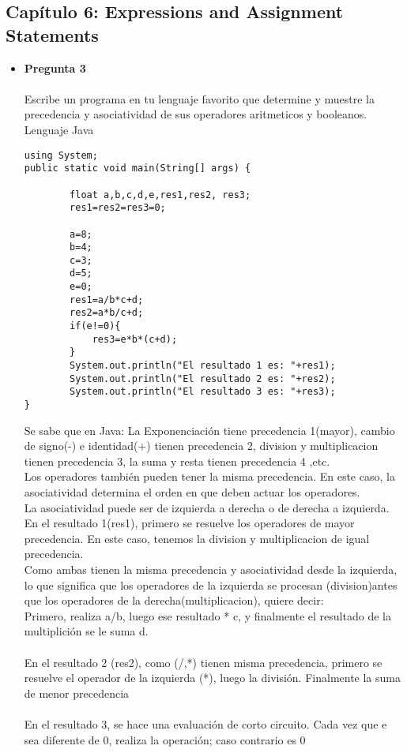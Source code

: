 \documentclass[12pt,oneside]{article}
\begin{document}
\begin{itemize}
\end{itemize}
\subsection{Capítulo 6: Expressions and Assignment Statements}
\begin{itemize}
\item {\bf Pregunta 3} \\\\
Escribe un programa en tu lenguaje favorito que determine y muestre la precedencia y asociatividad de sus operadores aritmeticos y booleanos.\\
Lenguaje Java\\
\begin{lstlisting}[frame=single]  % Start your code-block
using System;
public static void main(String[] args) {
        
        float a,b,c,d,e,res1,res2, res3;
        res1=res2=res3=0;
        
        a=8;
        b=4;
        c=3;
        d=5;
        e=0;
        res1=a/b*c+d;
        res2=a*b/c+d;
        if(e!=0){
            res3=e*b*(c+d);
        }
        System.out.println("El resultado 1 es: "+res1);
        System.out.println("El resultado 2 es: "+res2);
        System.out.println("El resultado 3 es: "+res3);
}

\end{lstlisting}

Se sabe que en Java: La Exponenciación tiene precedencia 1(mayor), cambio de signo(-) e identidad(+) tienen precedencia 2, division y multiplicacion tienen precedencia 3, la suma y resta tienen precedencia 4 ,etc.\\
Los operadores también pueden tener la misma precedencia. En este caso, la asociatividad determina el orden en que deben actuar los operadores. \\
La asociatividad puede ser de izquierda a derecha o de derecha a izquierda.\\
En el resultado 1(res1), primero se resuelve los operadores de mayor precedencia. En este caso, tenemos la division y multiplicacion de igual precedencia.\\
Como ambas tienen la misma precedencia y asociatividad desde la izquierda, lo que significa que los operadores de la izquierda se procesan (division)antes que los operadores de la derecha(multiplicacion), quiere decir:\\
Primero, realiza a/b, luego ese resultado * c, y finalmente el resultado de la multiplición se le suma d. \\\\
En el resultado 2 (res2), como (/,*) tienen misma precedencia, primero se resuelve el operador de la izquierda (*), luego la división. Finalmente la suma de menor precedencia\\\\
En el resultado 3, se hace una evaluación de corto circuito. Cada vez que e sea diferente de 0, realiza la operación; caso contrario es 0\\\\\\


\end{itemize}
\end{document}
